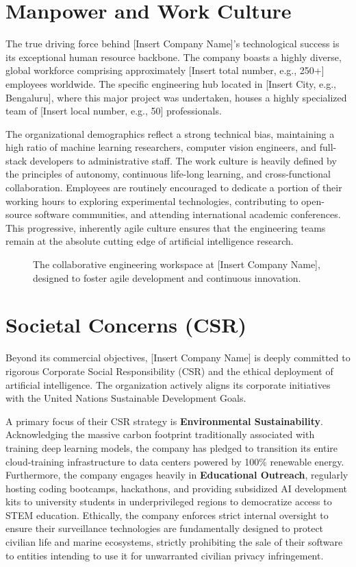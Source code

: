 \section{Manpower and Work Culture}
The true driving force behind [Insert Company Name]'s technological success is its exceptional human resource backbone. The company boasts a highly diverse, global workforce comprising approximately [Insert total number, e.g., 250+] employees worldwide. The specific engineering hub located in [Insert City, e.g., Bengaluru], where this major project was undertaken, houses a highly specialized team of [Insert local number, e.g., 50] professionals. 

The organizational demographics reflect a strong technical bias, maintaining a high ratio of machine learning researchers, computer vision engineers, and full-stack developers to administrative staff. The work culture is heavily defined by the principles of autonomy, continuous life-long learning, and cross-functional collaboration. Employees are routinely encouraged to dedicate a portion of their working hours to exploring experimental technologies, contributing to open-source software communities, and attending international academic conferences. This progressive, inherently agile culture ensures that the engineering teams remain at the absolute cutting edge of artificial intelligence research.

\begin{figure}[htb]
\centering
	\caption{The collaborative engineering workspace at [Insert Company Name], designed to foster agile development and continuous innovation.}
	\label{fig:workplace}
\end{figure}

\section{Societal Concerns (CSR)}
Beyond its commercial objectives, [Insert Company Name] is deeply committed to rigorous Corporate Social Responsibility (CSR) and the ethical deployment of artificial intelligence. The organization actively aligns its corporate initiatives with the United Nations Sustainable Development Goals. 

A primary focus of their CSR strategy is \textbf{Environmental Sustainability}. Acknowledging the massive carbon footprint traditionally associated with training deep learning models, the company has pledged to transition its entire cloud-training infrastructure to data centers powered by 100\% renewable energy. Furthermore, the company engages heavily in \textbf{Educational Outreach}, regularly hosting coding bootcamps, hackathons, and providing subsidized AI development kits to university students in underprivileged regions to democratize access to STEM education. Ethically, the company enforces strict internal oversight to ensure their surveillance technologies are fundamentally designed to protect civilian life and marine ecosystems, strictly prohibiting the sale of their software to entities intending to use it for unwarranted civilian privacy infringement.

